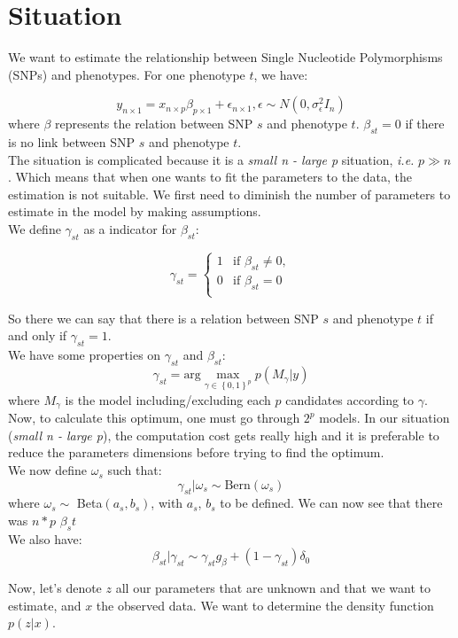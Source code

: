 \section{Situation}
We want to estimate the relationship between Single Nucleotide Polymorphisms (SNPs) and phenotypes. For one phenotype $t$, we have:

\begin{equation}
y_{n \times 1} = x_{n\times p} \beta_{p\times 1} + \epsilon_{n \times 1},  \epsilon \sim N \left( 0, \sigma_{\epsilon}^2I_n \right)
\label{eq:model}
\end{equation}
where $\beta$ represents the relation between SNP $s$ and phenotype $t$. $\beta_{st} = 0$ if there is no link between SNP $s$ and phenotype $t$.\\
\newline
The situation is complicated because it is a\textit{ small n - large p }situation, \textit{i.e.} $p \gg n$. Which means that when one wants to fit the parameters to the data, the estimation is not suitable. We first need to diminish the number of parameters to estimate in the model by making assumptions.\\
\newline
We define $\gamma_{st}$ as a indicator for $\beta_{st}$:

\begin{equation}
\gamma_{st} = \left\lbrace \begin{array}{ll}
1 & \text{if } \beta_{st} \neq 0,\\
0 & \text{if } \beta_{st}  = 0\\
\end{array}\right.
\label{eq:gamma}
\end{equation}

So there we can say that there is a relation between SNP $s$ and phenotype $t$ if and only if $\gamma_{st} = 1$.\\
We have some properties on $\gamma_{st}$ and $\beta_{st}$:
\begin{equation}
\gamma_{st} = \text{arg} \max_{\gamma \in \left\lbrace0,1\right\rbrace^p}p(M_\gamma|y)
\end{equation}
where $M_\gamma$ is the model including/excluding each $p$ candidates according to $\gamma$. \\
Now, to calculate this optimum, one must go through $2^p$ models. In our situation (\textit{small n - large p}), the computation cost gets really high and it is preferable to reduce the parameters dimensions before trying to find the optimum.\\
\newline
We now define $\omega_s$ such that:
\begin{equation}
\gamma_{st} | \omega_s \sim \text{Bern}(\omega_s)
\label{eq:omega}
\end{equation}
where $\omega_s\sim $ Beta$(a_s,b_s)$, with $a_s$, $b_s$ to be defined. We can now see that there was $n*p$ $\beta_st$ \\
\newline
We also have:
\begin{equation}
\beta_{st} | \gamma_{st} \sim \gamma_{st} g_{\beta} + (1-\gamma_{st})\delta_0
\label{eq:spikenslab}
\end{equation}

Now, let's denote $z$ all our parameters that are unknown and that we want to estimate, and $x$ the observed data. We want to determine the density function $p(z|x)$.